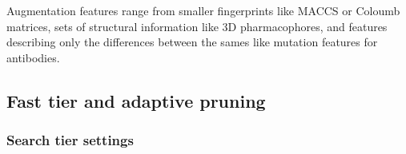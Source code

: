Augmentation features range from smaller fingerprints like MACCS or Coloumb matrices, sets of structural information like 3D pharmacophores, and features describing only the differences between the sames like mutation features for antibodies.


\subsection{Fast tier and adaptive pruning}

\subsubsection{Search tier settings}

